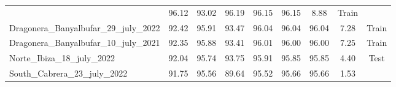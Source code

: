 \begin{table}[H]
{\begin{tabular}{lcccccccc}
                                                   & 96.12
                                                   & 93.02
                                                   & 96.19
                                                   & 96.15
                                                   & 96.15
                                                   & 8.88
                                                   & {\color[HTML]{66c2a5}
                    Train}
            \\
            Dragonera\_Banyalbufar\_29\_july\_2022 & 92.42
                                                   & 95.91
                                                   & 93.47
                                                   & 96.04
                                                   & 96.04
                                                   & 96.04
                                                   & 7.28
                                                   & {\color[HTML]{66c2a5}
                    Train}
            \\
            Dragonera\_Banyalbufar\_10\_july\_2021 & 92.35
                                                   & 95.88
                                                   & 93.41
                                                   & 96.01
                                                   & 96.00
                                                   & 96.00
                                                   & 7.25
                                                   & {\color[HTML]{66c2a5}
                    Train}
            \\
            Norte\_Ibiza\_18\_july\_2022           & 92.04
                                                   & 95.74
                                                   & 93.75
                                                   & 95.91
                                                   & 95.85
                                                   & 95.85
                                                   & 4.40
                                                   & {\color[HTML]{fc8d62}
                    Test}
            \\
            South\_Cabrera\_23\_july\_2022         & 91.75
                                                   & 95.56
                                                   & 89.64
                                                   & 95.52
                                                   & 95.66
                                                   & 95.66
                                                   & 1.53

\end{tabular}}
\end{table}
